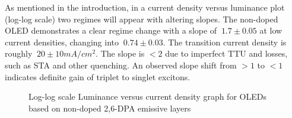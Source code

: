 \documentclass[
  letterpaper,
  DIV=11,
  numbers=noendperiod,
  oneside]{scrreprt}
\begin{document}
As mentioned in the introduction, in a current density versus luminance
plot (log-log scale) two regimes will appear with altering slopes. The
non-doped OLED demonstrates a clear regime change with a slope of
\(~1.7\pm0.05\) at low current densities, changing into
\(~0.74\pm0.03\). The transition current density is roughly
\(~20\pm10 mA/cm^2\). The slope is \(<2\) due to imperfect TTU and
losses, such as STA and other quenching. An observed slope shift from
\(>1\) to \(<1\) indicates definite gain of triplet to singlet excitons.

\begin{figure}

\begin{minipage}[t]{0.50\linewidth}

{\centering 


\caption{\label{fig-dpafit}Log-log scale Luminance versus current
density graph for OLEDs based on non-doped 2,6-DPA emissive layers}

}

\end{minipage}%
%
\begin{minipage}[t]{0.50\linewidth}

{\centering 

\raisebox{-\height}{

}}
\end{minipage}
\end{figure}
\end{document}
